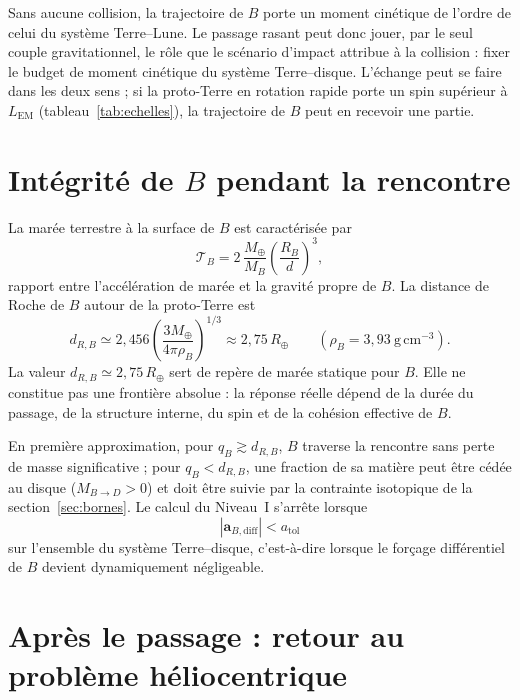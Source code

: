 \documentclass[11pt,a4paper,openany]{report}
\newcommand{\Mt}{M_{\oplus}}
\newcommand{\Rt}{R_{\oplus}}
\begin{document}
\begin{apport}
Sans aucune collision, la trajectoire de $B$ porte un moment cinétique de l'ordre de celui du
système Terre--Lune. Le passage rasant peut donc jouer, par le seul couple gravitationnel, le
rôle que le scénario d'impact attribue à la collision : fixer le budget de moment cinétique du
système Terre--disque. L'échange peut se faire dans les deux sens ; si la proto-Terre en rotation
rapide porte un spin supérieur à $L_{\mathrm{EM}}$ (tableau~\ref{tab:echelles}), la trajectoire de $B$
peut en recevoir une partie.
\end{apport}

\section{Intégrité de \texorpdfstring{$B$}{B} pendant la rencontre}

La marée terrestre à la surface de $B$ est caractérisée par
\begin{equation}
\mathcal{T}_B=2\,\frac{\Mt}{M_B}\left(\frac{R_B}{d}\right)^3,
\label{eq:TB}
\end{equation}
rapport entre l'accélération de marée et la gravité propre de $B$. La distance de Roche de $B$
autour de la proto-Terre est
\begin{equation}
d_{R,B}\simeq2{,}456\left(\frac{3\Mt}{4\pi\rho_B}\right)^{1/3}\approx2{,}75\,\Rt
\qquad(\rho_B=3{,}93\ \mathrm{g\,cm^{-3}}).
\label{eq:RocheB}
\end{equation}
La valeur $d_{R,B}\simeq2{,}75\,\Rt$ sert de repère de marée statique pour $B$. Elle ne constitue
pas une frontière absolue : la réponse réelle dépend de la durée du passage, de la structure
interne, du spin et de la cohésion effective de $B$.

En première approximation, pour $q_B\gtrsim d_{R,B}$, $B$ traverse la rencontre sans perte de masse significative ; pour
$q_B<d_{R,B}$, une fraction de sa matière peut être cédée au disque ($M_{B\to D}>0$) et doit être
suivie par la contrainte isotopique de la section~\ref{sec:bornes}. Le calcul du Niveau~I s'arrête
lorsque
\begin{equation}
|\mathbf{a}_{B,\mathrm{diff}}|<a_{\mathrm{tol}}
\label{eq:atol}
\end{equation}
sur l'ensemble du système Terre--disque, c'est-à-dire lorsque le forçage différentiel de $B$
devient dynamiquement négligeable.

\section{Après le passage : retour au problème héliocentrique}
\label{sec:retour-heliocentrique}
\end{document}
